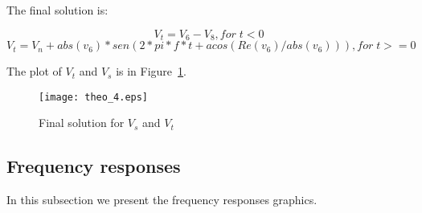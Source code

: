 \tab The final solution is: 

\begin {equation}[H]
V_t = V_6 - V_8, for\;t<0
\end {equation}
\begin {equation}[H]
V_t = V_n + abs(v_6) * sen (2 * pi * f * t + acos(Re(v_6) / abs(v_6))), for\;t>=0
\end {equation}

The plot of $V_t$ and $V_s$ is in Figure~\ref{fig:final}.

\begin{figure}[H] \centering
\texttt{[image: theo\_4.eps]}
\caption{Final solution for $V_s$ and $V_t$}
\label{fig:final}
\end{figure}

\subsection{Frequency responses}
\tab In this subsection we present the frequency responses graphics.
 
